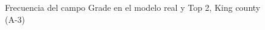 \begin{figure}[H]
    \centering
    
    \caption{Frecuencia del campo Grade en el modelo real y Top 2, King county (A-3)}
    \label{frecuency-top2-grade}
\end{figure}